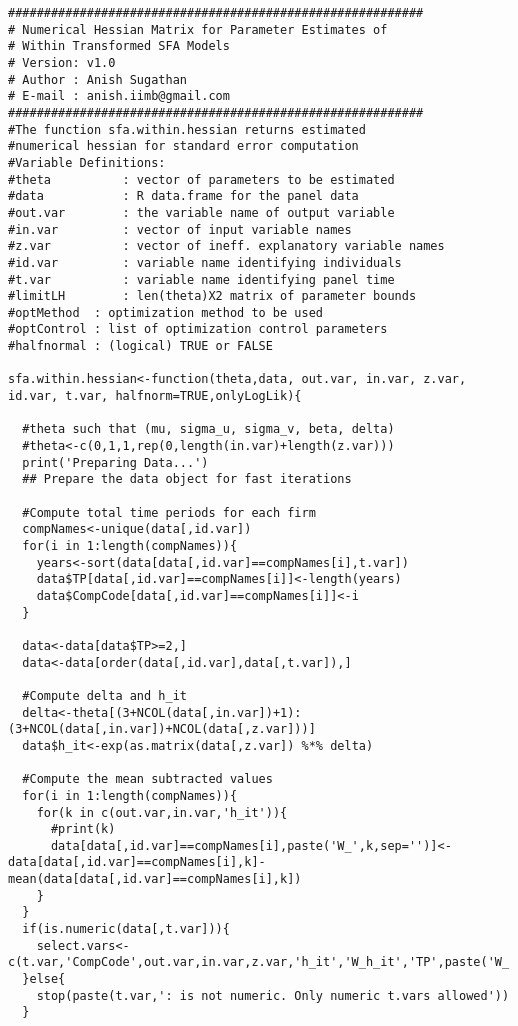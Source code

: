 \begin{lstlisting}[label=Rcode3, caption=R-Code for Numerical Estimation of Hessian Matrix]   
##########################################################
# Numerical Hessian Matrix for Parameter Estimates of
# Within Transformed SFA Models
# Version: v1.0
# Author : Anish Sugathan
# E-mail : anish.iimb@gmail.com 
########################################################## 
#The function sfa.within.hessian returns estimated
#numerical hessian for standard error computation
#Variable Definitions:
#theta   		: vector of parameters to be estimated
#data    		: R data.frame for the panel data 
#out.var 		: the variable name of output variable
#in.var  		: vector of input variable names
#z.var   		: vector of ineff. explanatory variable names
#id.var  		: variable name identifying individuals
#t.var	 		: variable name identifying panel time
#limitLH 		: len(theta)X2 matrix of parameter bounds
#optMethod	: optimization method to be used
#optControl	: list of optimization control parameters
#halfnormal	: (logical) TRUE or FALSE     

sfa.within.hessian<-function(theta,data, out.var, in.var, z.var, id.var, t.var, halfnorm=TRUE,onlyLogLik){
  
  #theta such that (mu, sigma_u, sigma_v, beta, delta)
  #theta<-c(0,1,1,rep(0,length(in.var)+length(z.var)))
  print('Preparing Data...')
  ## Prepare the data object for fast iterations
  
  #Compute total time periods for each firm
  compNames<-unique(data[,id.var])
  for(i in 1:length(compNames)){
    years<-sort(data[data[,id.var]==compNames[i],t.var])
    data$TP[data[,id.var]==compNames[i]]<-length(years)  
    data$CompCode[data[,id.var]==compNames[i]]<-i
  }  
  
  data<-data[data$TP>=2,]
  data<-data[order(data[,id.var],data[,t.var]),]
  
  #Compute delta and h_it
  delta<-theta[(3+NCOL(data[,in.var])+1):(3+NCOL(data[,in.var])+NCOL(data[,z.var]))]
  data$h_it<-exp(as.matrix(data[,z.var]) %*% delta)  
  
  #Compute the mean subtracted values  
  for(i in 1:length(compNames)){    
    for(k in c(out.var,in.var,'h_it')){
      #print(k)
      data[data[,id.var]==compNames[i],paste('W_',k,sep='')]<-data[data[,id.var]==compNames[i],k]-mean(data[data[,id.var]==compNames[i],k])
    }    
  }
  if(is.numeric(data[,t.var])){
    select.vars<-c(t.var,'CompCode',out.var,in.var,z.var,'h_it','W_h_it','TP',paste('W_',out.var,sep=''),paste('W_',in.var,sep=''))
  }else{
    stop(paste(t.var,': is not numeric. Only numeric t.vars allowed'))
  }
  

\end{lstlisting}
